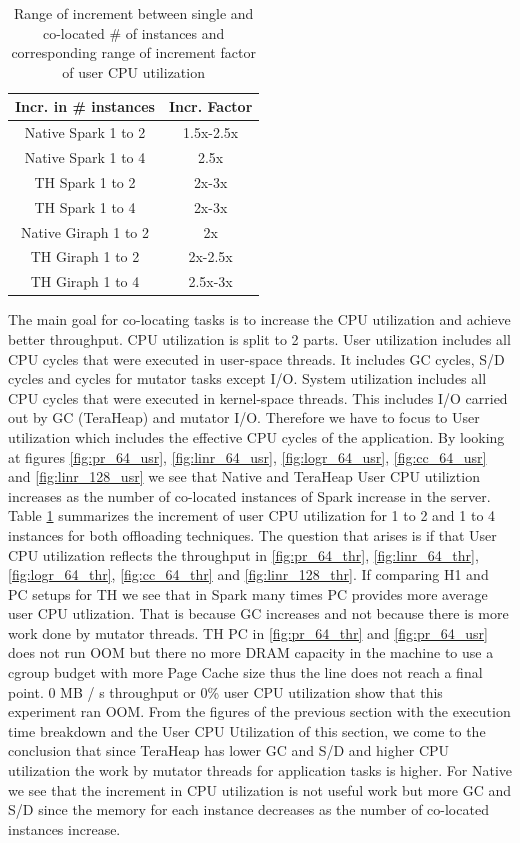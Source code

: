 \begin{table}[t!]
  \centering
  \caption{Range of increment between single and co-located \# of instances and corresponding range of increment factor of user CPU utilization}
  \label{tab:user_factors}
  \begin{tabular}{|c|c|}
    \hline
    \textbf{Incr. in # instances} & \textbf{Incr. Factor} \\
    \hline
    Native Spark 1 to 2  & 1.5x-2.5x \\
    Native Spark 1 to 4 & 2.5x \\
    TH Spark 1 to 2 & 2x-3x \\
    TH Spark 1 to 4 & 2x-3x \\
    Native Giraph 1 to 2 & 2x \\
    TH Giraph 1 to 2 & 2x-2.5x \\
    TH Giraph 1 to 4 & 2.5x-3x \\
    \hline
  \end{tabular}
\end{table}


The main goal for co-locating tasks is to increase the CPU utilization and achieve better
throughput. CPU utilization is split to 2 parts. 
User utilization includes all CPU cycles that were executed in user-space threads.
It includes GC cycles, S/D cycles and cycles for mutator tasks except I/O.
System utilization includes all CPU cycles that were executed in kernel-space threads.
This includes I/O carried out by GC (TeraHeap) and mutator I/O.
Therefore we have to focus to User utilization which includes the effective CPU cycles of the application.
By looking at figures \ref{fig:pr_64_usr}, \ref{fig:linr_64_usr},
\ref{fig:logr_64_usr}, \ref{fig:cc_64_usr} and \ref{fig:linr_128_usr} we see that Native and TeraHeap User CPU utiliztion
increases as the number of co-located instances of Spark increase in the server.
Table \ref{tab:user_factors} summarizes the increment of user CPU utilization for 1 to 2 and 1 to 4 instances for both offloading techniques.
The question that arises is if that User CPU utilization reflects the throughput in \ref{fig:pr_64_thr}, \ref{fig:linr_64_thr},
\ref{fig:logr_64_thr}, \ref{fig:cc_64_thr} and \ref{fig:linr_128_thr}. If comparing H1 and PC setups for TH we see that in Spark many times PC provides more average user CPU utlization. That is because GC increases and not because there is more work done by mutator threads. TH PC in \ref{fig:pr_64_thr} and \ref{fig:pr_64_usr} does not run OOM but there no more DRAM capacity in the machine to use a cgroup budget with more Page Cache size thus the line does not reach a final point. 0 MB / s throughput or 0\% user CPU utilization show that this experiment ran OOM.
From the figures of the previous section with the execution time breakdown and the User CPU Utilization of this section, we come to the conclusion that since TeraHeap has lower GC and S/D and higher CPU utilization the work by mutator threads for application tasks is higher.
For Native we see that the increment in CPU utilization is not useful work but more GC and S/D since the memory for each instance decreases as the number of co-located instances increase.

